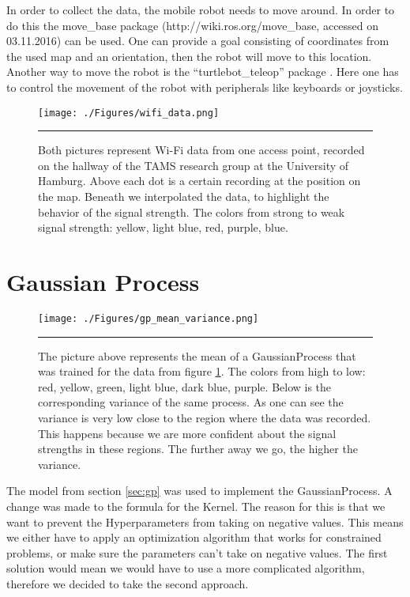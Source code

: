 In order to collect the data, the mobile robot needs to move around. In order to do this the move\_base package (http://wiki.ros.org/move\_base, accessed on 03.11.2016) can be used. One can provide a goal consisting of coordinates from the used map and an orientation, then the robot will move to this location. Another way to move the robot is the ``turtlebot\_teleop'' package . Here one has to control the movement of the robot with peripherals like keyboards or joysticks. 
\begin{figure}[htbp]
	\centering
		\texttt{[image: ./Figures/wifi\_data.png]}\\%
		\rule{35em}{0.5pt}
	\caption[Wi-Fi data]{Both pictures represent Wi-Fi data from one access point, recorded on the hallway of the TAMS research group at the University of Hamburg. Above each dot is a certain recording at the position on the map. Beneath we interpolated the data, to highlight the behavior of the signal strength. The colors from strong to weak signal strength: yellow, light blue, red, purple, blue.}
	\label{fig:wifi_data}
\end{figure}
 
\section{Gaussian Process}\label{sec:gausspr}

\begin{figure}[htbp]
	\centering
		\texttt{[image: ./Figures/gp\_mean\_variance.png]}\\%
		\rule{35em}{0.5pt}
	\caption[Wi-Fi data and the corresponding \Gls{GaussianProcess}]{The picture above represents the mean of a \Gls{GaussianProcess} that was trained for the data from figure \ref{fig:wifi_data}. The colors from high to low: red, yellow, green, light blue, dark blue, purple. Below is the corresponding variance of the same process. As one can see the variance is very low close to the region where the data was recorded. This happens because we are more confident about the signal strengths in these regions. The further away we go, the higher the variance.}
	\label{fig:gp_mean_var}
\end{figure}
The model from section \ref{sec:gp} was used to implement the \Gls{GaussianProcess}. A change was made to the formula for the \gls{Kernel}. The reason for this is that we want to prevent the \gls{Hyperparameter}s from taking on negative values. This means we either have to apply an optimization algorithm that works for constrained problems, or make sure the parameters can't take on negative values. The first solution would mean we would have to use a more complicated algorithm, therefore we decided to take the second approach. 

